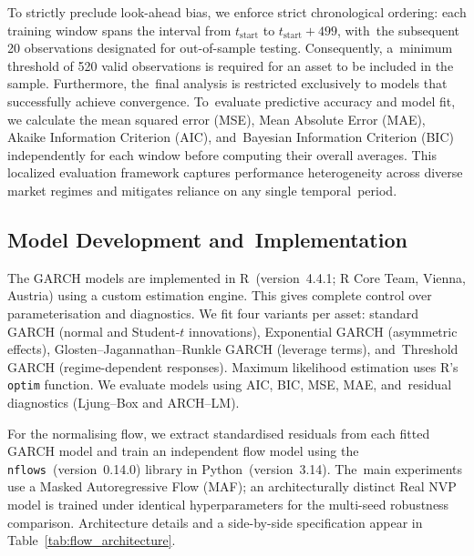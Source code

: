 \documentclass[risks,article,accept,pdftex,moreauthors]{Definitions/mdpi}
\begin{document}
To strictly preclude look-ahead bias, we enforce strict chronological ordering: each training window spans the interval from $t_{\text{start}}$ to $t_{\text{start}} + 499$, with~the subsequent 20 observations designated for out-of-sample testing. Consequently, a~minimum threshold of 520 valid observations is required for an asset to be included in the sample. Furthermore, the~final analysis is restricted exclusively to models that successfully achieve convergence. To~evaluate predictive accuracy and model fit, we calculate the mean squared error (MSE), Mean Absolute Error (MAE), Akaike Information Criterion (AIC), and~Bayesian Information Criterion (BIC) independently for each window before computing their overall averages. This localized evaluation framework captures performance heterogeneity across diverse market regimes and mitigates reliance on any single temporal~period.


\subsection{Model Development and~Implementation} 

The GARCH models are implemented in \textsf{{R}}~(version~4.4.1; R Core Team, Vienna, Austria) %
using a custom estimation engine. This gives complete control over parameterisation and diagnostics. We fit four variants per asset: standard GARCH (normal and Student-$t$ innovations), Exponential GARCH (asymmetric effects), Glosten–Jagannathan–Runkle GARCH (leverage terms), and~Threshold GARCH (regime-dependent responses). Maximum likelihood estimation uses {\textsf{R}'s \texttt{optim} %
} function. We evaluate models using AIC, BIC, MSE, MAE, and~residual diagnostics (Ljung–Box and ARCH–LM).

For the normalising flow, we extract standardised residuals from each fitted GARCH model and train an independent flow model using the \texttt{nflows}~(version~0.14.0) library in {\textsf{Python}~(version~3.14).} %
 The~main experiments use a Masked Autoregressive Flow (MAF); an architecturally distinct Real NVP model is trained under identical hyperparameters for the multi-seed robustness comparison. Architecture details and a side-by-side specification appear in Table~\ref{tab:flow_architecture}.
\end{document}
